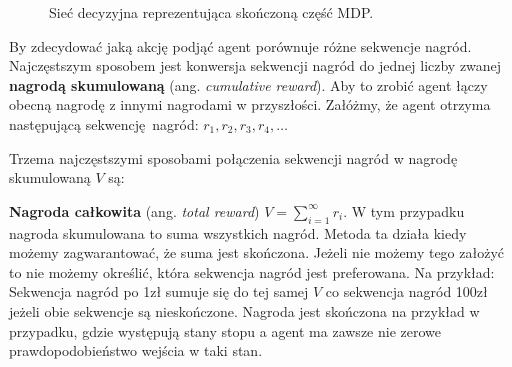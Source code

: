 \documentclass[a4paper, 12pt,oneside]{book}
\begin{document}
\begin{figure}[!htb]
\begin{center}
\caption{Sieć decyzyjna reprezentująca skończoną część MDP.}
\label{markov_decision_process}
\end{center}
\end{figure}

By zdecydować jaką akcję podjąć agent porównuje różne sekwencje nagród.
Najczęstszym sposobem jest konwersja sekwencji nagród do jednej liczby zwanej
\textbf{nagrodą skumulowaną} (ang. \textit{cumulative reward}). Aby to zrobić
agent łączy obecną nagrodę z innymi nagrodami w przyszłości. Załóżmy, że agent
otrzyma następującą sekwencję nagród: $r_1, r_2, r_3, r_4, \dots$

Trzema najczęstszymi sposobami połączenia sekwencji nagród w nagrodę
skumulowaną $V$ są:

\textbf{Nagroda całkowita} (ang. \textit{total reward}) $V =
\sum_{i=1}^{\infty} r_i$. W tym przypadku nagroda skumulowana to suma
wszystkich nagród. Metoda ta działa kiedy możemy zagwarantować, że suma jest
skończona. Jeżeli nie możemy tego założyć to nie możemy określić, która
sekwencja nagród jest preferowana. Na przykład: Sekwencja nagród po 1zł sumuje
się do tej samej $V$ co sekwencja nagród 100zł jeżeli obie sekwencje są
nieskończone. Nagroda jest skończona na przykład w przypadku, gdzie występują
stany stopu a agent ma zawsze nie zerowe prawdopodobieństwo wejścia w taki
stan.
\end{document}
